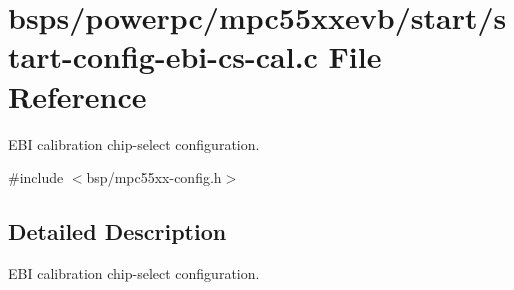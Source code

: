\hypertarget{start-config-ebi-cs-cal_8c}{}\section{bsps/powerpc/mpc55xxevb/start/start-\/config-\/ebi-\/cs-\/cal.c File Reference}
\label{start-config-ebi-cs-cal_8c}


E\+BI calibration chip-\/select configuration.  


{\ttfamily \#include $<$bsp/mpc55xx-\/config.\+h$>$}\newline


\subsection{Detailed Description}
E\+BI calibration chip-\/select configuration. 

